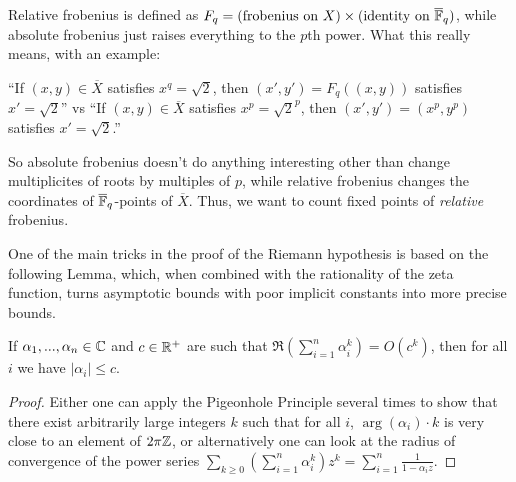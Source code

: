 \documentclass[letterpaper,11pt]{article}
\begin{document}
Relative frobenius is defined as $F_q = (\text{frobenius on }X)\times (\text{identity on }\overline{\mathbb{F}}_q)$, while absolute frobenius just raises everything to the $p$th power. What this really means, with an example:

``If $(x,y) \in \overline{X}$ satisfies $x^q = \sqrt{2}$, then  $(x', y') = F_q((x,y))$ satisfies $x' = \sqrt{2}$''
vs
``If $(x,y) \in \overline{X}$ satisfies $x^p = \sqrt{2}^p$, then $(x', y') = (x^p,y^p)$ satisfies $x' = \sqrt{2}$.''

So absolute frobenius doesn't do anything interesting other than change multiplicites of roots by multiples of $p$, while relative frobenius changes the coordinates of $\overline{\mathbb{F}}_q$-points of $\overline{X}$. Thus, we want to count fixed points of \emph{relative} frobenius.

One of the main tricks in the proof of the Riemann hypothesis is based on the following Lemma, which, when combined with the rationality of the zeta function, turns asymptotic bounds with poor implicit constants into more precise bounds.

\begin{lem} If $\alpha_1, ..., \alpha_n \in \mathbb{C}$ and $c \in \mathbb{R}^+$ are such that $\Re(\sum_{i=1}^n \alpha_i^k) = O(c^k)$, then for all $i$ we have $|\alpha_i| \le c$.
\end{lem}
\begin{proof} Either one can apply the Pigeonhole Principle several times to show that there exist arbitrarily large integers $k$ such that for all $i$, $\arg(\alpha_i)\cdot k$ is very close to an element of $2\pi\mathbb{Z}$, or alternatively one can look at the radius of convergence of the power series $\sum_{k \ge 0}(\sum_{i=1}^n \alpha_i^k)z^k = \sum_{i=1}^n \frac{1}{1-\alpha_iz}$.
\end{proof}
\end{document}
